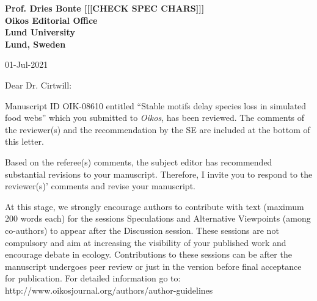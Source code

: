 \documentclass[12pt]{letter}
\begin{document}
\begin{letter}{\bf Prof. Dries Bonte [[[CHECK SPEC CHARS]]]\\
Oikos Editorial Office \\
Lund University \\
Lund, Sweden}




01-Jul-2021

Dear Dr. Cirtwill:

Manuscript ID OIK-08610 entitled ``Stable motifs delay species loss in simulated food webs'' which you submitted to \emph{Oikos}, has been reviewed.  The comments of the reviewer(s) and the recommendation by the SE are included at the bottom of this letter.

Based on the referee(s) comments, the subject editor has recommended substantial revisions to your manuscript.  Therefore, I invite you to respond to the reviewer(s)' comments and revise your manuscript.

At this stage, we strongly encourage authors to contribute with text (maximum 200 words each) for the sessions Speculations and Alternative Viewpoints (among co-authors) to appear after the Discussion session.  These sessions are not compulsory and aim at increasing the visibility of your published work and encourage debate in ecology. Contributions to these sessions can be after the manuscript undergoes peer review or just in the version before final acceptance for publication.   For detailed information go to: http://www.oikosjournal.org/authors/author-guidelines


\end{letter}
\end{document}
